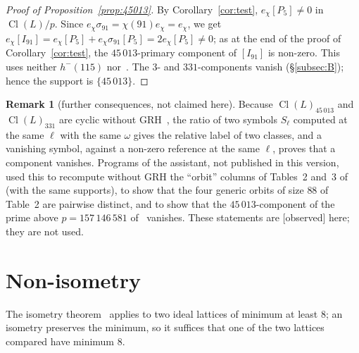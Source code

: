 \documentclass[11pt,a4paper]{amsart}
\theoremstyle{plain}
\theoremstyle{definition}
\newtheorem{remark}[theorem]{Remark}
\DeclareMathOperator{\Cl}{Cl}
\newcommand{\st}[1]{\textup{\textsf{\small[#1]}}}
\newcommand{\CONS}{\st{observed}}
\begin{document}
\begin{proof}[Proof of Proposition~\ref{prop:45013}]
By Corollary~\ref{cor:test}, $e_\chi[P_5]\ne0$ in $\Cl(L)/p$. Since $e_\chi\sigma_{91}=\chi(91)e_\chi=e_\chi$, we get $e_\chi[I_{91}]=e_\chi[P_5]+e_\chi\sigma_{91}[P_5]=2e_\chi[P_5]\ne0$; as at the end of the proof of Corollary~\ref{cor:test}, the $45\,013$-primary component of $[I_{91}]$ is non-zero. This uses neither $h^-(115)$ nor~\cite{Mil14}. The $3$- and $331$-components vanish (\S\ref{subsec:B}); hence the support is $\{45\,013\}$.
\end{proof}

\begin{remark}[further consequences, not claimed here]\label{rem:autres}
Because $\Cl(L)_{45\,013}$ and $\Cl(L)_{331}$ are cyclic without GRH~\cite[Prop.~2.2]{Gau26}, the ratio of two symbols $S_\ell$ computed at the same $\ell$ with the same $\omega$ gives the relative label of two classes, and a vanishing symbol, against a non-zero reference at the same $\ell$, proves that a component vanishes. Programs of the assistant, not published in this version, used this to recompute without GRH the ``orbit'' columns of Tables~2 and~3 of~\cite{Gau26} (with the same supports), to show that the four generic orbits of size $88$ of Table~2 are pairwise distinct, and to show that the $45\,013$-component of the prime above $p=157\,146\,581$ of~\cite[\S4.5]{Gau26a} vanishes. These statements are \CONS{} here; they are not used.
\end{remark}

\section{Non-isometry}\label{sec:noniso}

The isometry theorem~\cite[Thm.~3.3]{Gau26} applies to two ideal lattices of minimum at least $8$; an isometry preserves the minimum, so it suffices that one of the two lattices compared have minimum $8$.
\end{document}
